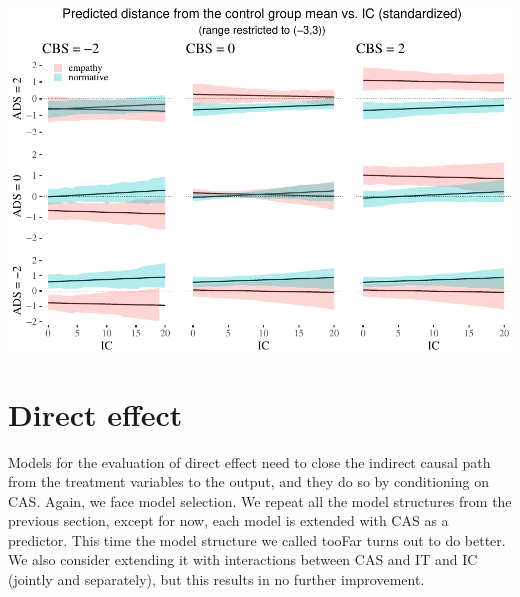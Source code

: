 \documentclass[10pt,dvipsnames,enabledeprecatedfontcommands]{scrartcl}
\begin{document}
\begin{center}\includegraphics[width=1\linewidth]{bayesianReport3_files/figure-latex/unnamed-chunk-15-1} \end{center}

\normalsize

\section{Direct effect}\label{direct-effect}

Models for the evaluation of direct effect need to close the indirect
causal path from the treatment variables to the output, and they do so
by conditioning on \textsf{CAS}. Again, we face model selection. We
repeat all the model structures from the previous section, except for
now, each model is extended with \textsf{CAS} as a predictor. This time
the model structure we called \textsf{tooFar} turns out to do better. We
also consider extending it with interactions between \textsf{CAS} and
\textsf{IT} and \textsf{IC} (jointly and separately), but this results
in no further improvement.

\vspace{1mm} \footnotesize
\end{document}

